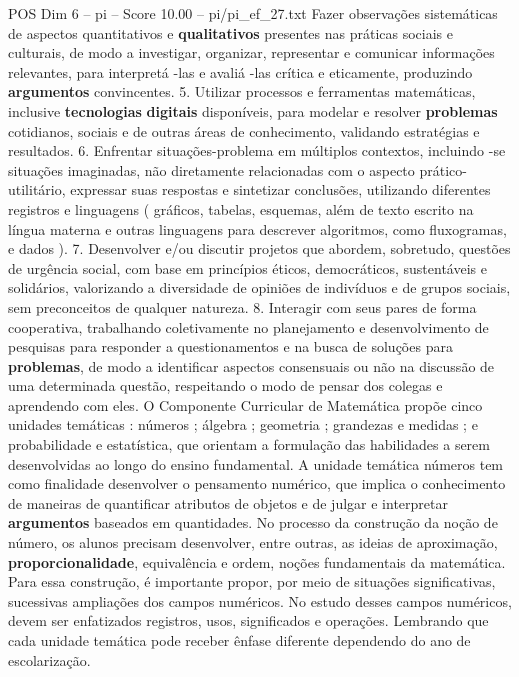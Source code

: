 \begin{textsample}{POS Dim 6 – pi – Score 10.00 – pi/pi\_ef\_27.txt}
Fazer observações sistemáticas de aspectos quantitativos e \textbf{qualitativos} presentes nas práticas sociais e culturais, de modo a investigar, organizar, representar e comunicar informações relevantes, para interpretá -las e avaliá -las crítica e eticamente, produzindo \textbf{argumentos} convincentes. 5.
Utilizar processos e ferramentas matemáticas, inclusive \textbf{tecnologias} \textbf{digitais} disponíveis, para modelar e resolver \textbf{problemas} cotidianos, sociais e de outras áreas de conhecimento, validando estratégias e resultados. 6.
Enfrentar situações-problema em múltiplos contextos, incluindo -se situações imaginadas, não diretamente relacionadas com o aspecto prático-utilitário, expressar suas respostas e sintetizar conclusões, utilizando diferentes registros e linguagens ( gráficos, tabelas, esquemas, além de texto escrito na língua materna e outras linguagens para descrever algoritmos, como fluxogramas, e dados ). 7.
Desenvolver e/ou discutir projetos que abordem, sobretudo, questões de urgência social, com base em princípios éticos, democráticos, sustentáveis e solidários, valorizando a diversidade de opiniões de indivíduos e de grupos sociais, sem preconceitos de qualquer natureza. 8.
Interagir com seus pares de forma cooperativa, trabalhando coletivamente no planejamento e desenvolvimento de pesquisas para responder a questionamentos e na busca de soluções para \textbf{problemas}, de modo a identificar aspectos consensuais ou não na discussão de uma determinada questão, respeitando o modo de pensar dos colegas e aprendendo com eles.
O Componente Curricular de Matemática propõe cinco unidades temáticas : números ; álgebra ; geometria ; grandezas e medidas ; e probabilidade e estatística, que orientam a formulação das habilidades a serem desenvolvidas ao longo do ensino fundamental.
A unidade temática números tem como finalidade desenvolver o pensamento numérico, que implica o conhecimento de maneiras de quantificar atributos de objetos e de julgar e interpretar \textbf{argumentos} baseados em quantidades.
No processo da construção da noção de número, os alunos precisam desenvolver, entre outras, as ideias de aproximação, \textbf{proporcionalidade}, equivalência e ordem, noções fundamentais da matemática.
Para essa construção, é importante propor, por meio de situações significativas, sucessivas ampliações dos campos numéricos.
No estudo desses campos numéricos, devem ser enfatizados registros, usos, significados e operações.
Lembrando que cada unidade temática pode receber ênfase diferente dependendo do ano de escolarização.

\end{textsample}
